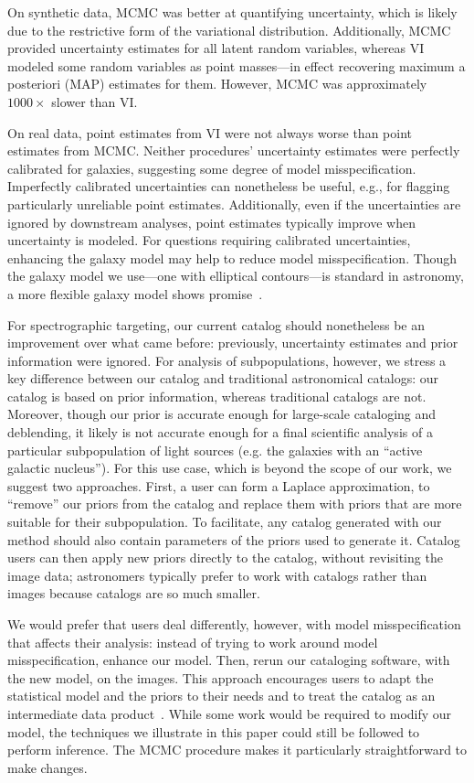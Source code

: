 On synthetic data, MCMC was better at quantifying uncertainty, which is likely due to the restrictive form
of the variational distribution.
Additionally, MCMC provided uncertainty estimates for all latent random variables, whereas VI modeled some random variables as point masses---in effect recovering maximum a posteriori (MAP) estimates for them.
However, MCMC was approximately $1000\times$ slower than VI.

On real data, point estimates from VI were not always worse than point estimates from MCMC. Neither procedures' uncertainty estimates were perfectly calibrated for galaxies, suggesting some degree of model misspecification.
Imperfectly calibrated uncertainties can nonetheless be useful, e.g., for flagging particularly unreliable point estimates. Additionally, even if the uncertainties are ignored by downstream analyses, point estimates typically improve when uncertainty is modeled.
For questions requiring calibrated uncertainties, enhancing the galaxy model may help to reduce model misspecification.
Though the galaxy model we use---one with elliptical contours---is standard in astronomy, a more flexible galaxy model shows promise~\citep{regier2015deep}.

For spectrographic targeting, our current catalog should nonetheless
be an improvement over what came before: previously, uncertainty estimates and prior information were ignored. For analysis of subpopulations, however, we stress a key difference between our catalog and traditional astronomical catalogs: our catalog is based on prior information, whereas traditional catalogs are not.
Moreover, though our prior is accurate enough for large-scale cataloging and deblending, it likely is not accurate enough for a final scientific analysis of a particular subpopulation of light sources (e.g. the galaxies with an ``active galactic nucleus'').
For this use case, which is beyond the scope of our work, we suggest two approaches. First, a user can form a Laplace approximation, to ``remove'' our priors from the catalog and replace them with priors that are more suitable for their subpopulation. To facilitate, any catalog generated with our method should also contain parameters of the priors used to generate it.
Catalog users can then apply new priors directly to the catalog, without revisiting the image data; astronomers typically prefer to work with catalogs rather than images because catalogs are so much smaller.

We would prefer that users deal differently, however, with model misspecification that affects their analysis:
instead of trying to work around model misspecification, enhance our model.
Then, rerun our cataloging software, with the new model, on the images. This approach encourages users to adapt the statistical model and the priors to their needs and to treat the catalog as an intermediate data product~\citep{turon2010telescopes}.
While some work would be required to modify our model, the techniques we illustrate in this paper could still be followed to perform inference.
The MCMC procedure makes it particularly straightforward to make changes.

